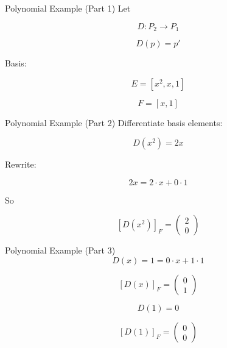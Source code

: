 \documentclass[aspectratio=169]{beamer}
\begin{document}
\begin{frame}{Polynomial Example (Part 1)}
Let

\[
D: P_2 \to P_1
\]

\[
D(p) = p'
\]

Basis:

\[
E = [x^2, x, 1]
\]

\[
F = [x, 1]
\]

\end{frame}

\begin{frame}{Polynomial Example (Part 2)}
Differentiate basis elements:

\[
D(x^2) = 2x
\]

Rewrite:

\[
2x = 2\cdot x + 0\cdot 1
\]

So

\[
[D(x^2)]_F =
\begin{pmatrix}
2\\0
\end{pmatrix}
\]

\end{frame}

\begin{frame}{Polynomial Example (Part 3)}
\[
D(x) = 1 = 0\cdot x + 1\cdot 1
\]

\[
[D(x)]_F =
\begin{pmatrix}
0\\1
\end{pmatrix}
\]

\[
D(1)=0
\]

\[
[D(1)]_F =
\begin{pmatrix}
0\\0
\end{pmatrix}
\]

\end{frame}
\end{document}
